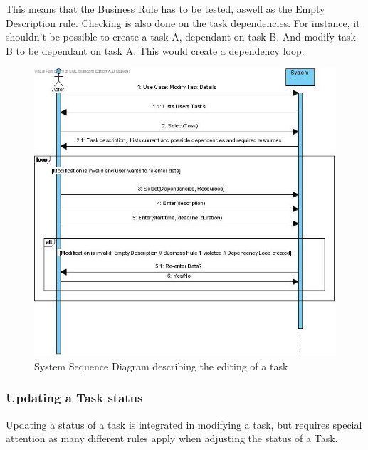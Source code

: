 \documentclass[a4paper,11pt]{article}
\begin{document}
			This means that the Business Rule has to be tested, aswell as the Empty Description rule. Checking is also done on the task dependencies. For instance, it shouldn't be possible to create a task A, dependant on task B. And modify task B to be dependant on task A. This would create a dependency loop.\\
			\begin{figure}[h!]
				\begin{center}
					\includegraphics[scale=0.5]{images/ssd_modify_task.jpg}
				\end{center}
				\caption{System Sequence Diagram describing the editing of a task}
			\end{figure}
			 \subsubsection{Updating a Task status}
			Updating a status of a task is integrated in modifying a task, but requires special attention as many different rules apply when adjusting the status of a Task.
\end{document}
